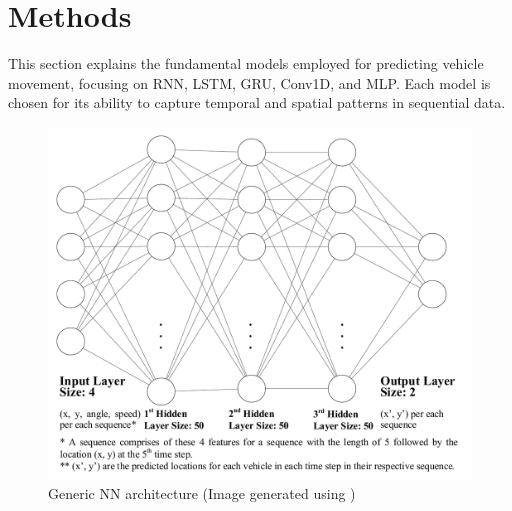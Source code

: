 \documentclass[conference]{IEEEtran}
\begin{document}
{\section{Methods} \label{methods}
This section explains the fundamental models employed for predicting vehicle movement, focusing on RNN, LSTM, GRU, Conv1D, and MLP. Each model is chosen for its ability to capture temporal and spatial patterns in sequential data.

\begin{figure}
\vspace{-4mm}
    \centering
    \includegraphics[width=1.06\linewidth]{figures/architecture.pdf}
    \caption{Generic NN architecture (Image generated using \cite{joss19lenail})}
    \label{fig:nn-architecture}
\vspace{-4mm}
\end{figure}

}
\end{document}

